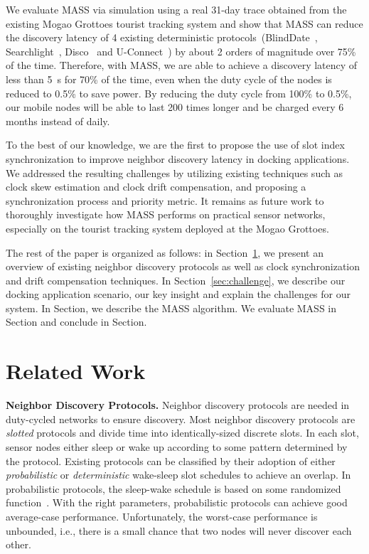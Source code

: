 \documentclass[twoside,twocolumn]{article}
\begin{document}
We evaluate MASS via simulation using a real 31-day trace obtained from the existing Mogao Grottoes tourist tracking system
and show that MASS can reduce the discovery latency of 4 existing deterministic protocols~(BlindDate~\citep{wang13blinddate}, 
Searchlight~\citep{bakht2012searchlight}, Disco~\citep{Dutta2008Practical} and U-Connect~\citep{kandhalu2010u}) by about 2 
orders of magnitude over 75\% of the time. Therefore, with MASS, we are able to achieve a discovery latency of less than 5~s
for 70\% of the time, even when the duty cycle of the nodes is reduced to 0.5\% to save power. By reducing the duty cycle
from 100\% to 0.5\%, our mobile nodes will be able to last 200 times longer and be charged every 6 months instead of daily.

To the best of our knowledge, we are the first to propose the use of slot index synchronization to improve neighbor discovery
latency in docking applications. We addressed the resulting challenges by utilizing existing techniques such as clock skew
estimation and clock drift compensation, and proposing a synchronization process and priority metric. It remains as future
work to thoroughly investigate how MASS performs on practical sensor networks, especially on the tourist tracking system
deployed at the Mogao Grottoes.

The rest of the paper is organized as follows: in Section~\ref{sec:related}, we present an overview of existing neighbor 
discovery protocols as well as clock synchronization and drift compensation techniques. In Section~\ref{sec:challenge}, 
we describe our docking application scenario, our key insight and explain the challenges for our system. In Section, we 
describe the MASS algorithm. We evaluate MASS in Section and conclude in Section.

\section{Related Work}
\label{sec:related}

{\bf Neighbor Discovery Protocols.} Neighbor discovery protocols are needed in duty-cycled 
networks to ensure discovery. Most neighbor discovery protocols are \emph{slotted} protocols
and divide time into identically-sized discrete slots. In each slot, sensor nodes either
sleep or wake up according to some pattern determined by the protocol. Existing protocols
can be classified by their adoption of either \emph{probabilistic} or \emph{deterministic}
wake-sleep slot schedules to achieve an overlap. In probabilistic protocols, the sleep-wake 
schedule is based on some randomized function~\citep{mcglynn2001birthday}. With the right
parameters, probabilistic protocols can achieve good average-case performance. Unfortunately, 
the worst-case performance is unbounded, i.e., there is a small chance that two nodes will 
never discover each other.
\end{document}
